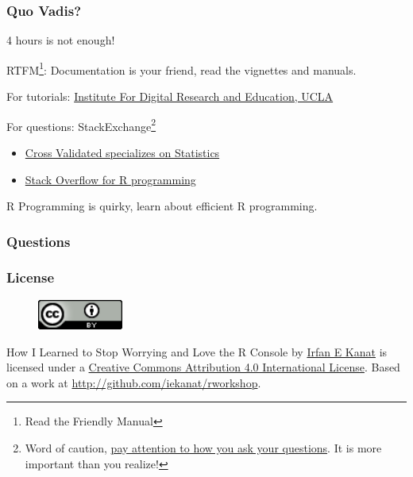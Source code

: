 \documentclass{beamer}\usepackage[]{graphicx}\usepackage[]{color}
\begin{document}
\begin{frame}
\frametitle{Quo Vadis?}

4 hours is not enough! \vfill

RTFM\footnote{Read the Friendly Manual}: Documentation is your friend, read the vignettes and manuals.\vfill

For tutorials: \href{http://www.ats.ucla.edu/stat/r/}{Institute For Digital Research and Education, UCLA} \vfill

For questions: StackExchange\footnote{Word of caution, \href{http://stackoverflow.com/help/how-to-ask}{pay attention to how you ask your questions}. It is more important than you realize!}
\begin{itemize}
\item \href{http://stats.stackexchange.com/}{Cross Validated specializes on Statistics}
\item \href{http://stackoverflow.com/}{Stack Overflow for R programming}
\end{itemize}
\vfill

R Programming is quirky, learn about efficient R programming.

\end{frame}

\begin{frame}
	\frametitle{Questions}
	\begin{center}
		\vfill
		\vfill
	\end{center}
\end{frame}

\begin{frame}[label=license]
    \frametitle{License}

\begin{figure} %
    \centering
    \includegraphics[width=0.25\textwidth]{figures/CCBig.png}
\end{figure}

How I Learned to Stop Worrying and Love the R Console by \href{http://irfankanat.com}{Irfan E Kanat} is licensed under a \href{http://creativecommons.org/licenses/by/4.0/}{Creative Commons Attribution 4.0 International License}. Based on a work at \href{http://github.com/iekanat/rworkshop}{http://github.com/iekanat/rworkshop}.


\end{frame}
\end{document}
